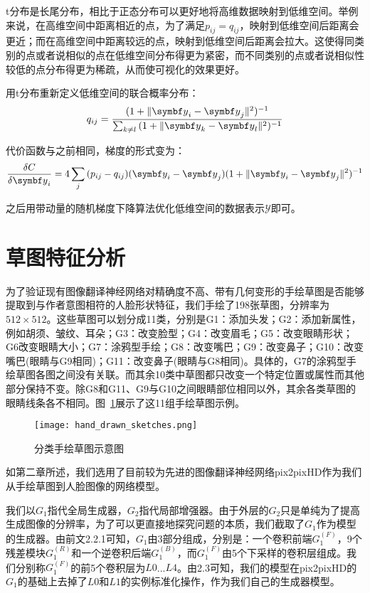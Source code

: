 t分布是长尾分布，相比于正态分布可以更好地将高维数据映射到低维空间。举例来说，在高维空间中距离相近的点，为了满足$p_{ij}=q_{ij}$，映射到低维空间后距离会更近；而在高维空间中距离较远的点，映射到低维空间后距离会拉大。这使得同类别的点或者说相似的点在低维空间分布得更为紧密，而不同类别的点或者说相似性较低的点分布得更为稀疏，从而使可视化的效果更好。

用t分布重新定义低维空间的联合概率分布：
\begin{equation}
	q_{ij} = \frac{(1+\lVert \vy_i-\vy_j\rVert^2)^{-1}}{\sum_{k\ne l}{(1+\lVert \vy_k-\vy_l \rVert^2)^{-1}}}
\end{equation}

代价函数与之前相同，梯度的形式变为：
\begin{equation}
	\frac{\delta C}{\delta \vy_i}=4\sum_{j}{(p_{ij}-q_{ij})(\vy_i-\vy_j)(1+\lVert \vy_i-\vy_j \rVert^2)^{-1}}
\end{equation}

之后用带动量的随机梯度下降算法优化低维空间的数据表示$\mathcal{Y}$即可。


\section{草图特征分析}

为了验证现有图像翻译神经网络对精确度不高、带有几何变形的手绘草图是否能够提取到与作者意图相符的人脸形状特征，我们手绘了198张草图，分辨率为$512\times512$。这些草图可以划分成11类，分别是G1：添加头发；G2：添加新属性，例如胡须、皱纹、耳朵；G3：改变脸型；G4：改变眉毛；G5：改变眼睛形状；G6改变眼睛大小；G7：涂鸦型手绘；G8：改变嘴巴；G9：改变鼻子；G10：改变嘴巴(眼睛与G9相同)；G11：改变鼻子(眼睛与G8相同)。具体的，G7的涂鸦型手绘草图各图之间没有关联。而其余10类中草图都只改变一个特定位置或属性而其他部分保持不变。除G8和G11、G9与G10之间眼睛部位相同以外，其余各类草图的眼睛线条各不相同。图~\ref{fig:hand_drawn_contours}展示了这11组手绘草图示例。
\begin{figure}[htb]
	\centering
	\texttt{[image: hand\_drawn\_sketches.png]}
	\caption{分类手绘草图示意图}
	\label{fig:hand_drawn_contours}
\end{figure}

如第二章所述，我们选用了目前较为先进的图像翻译神经网络pix2pixHD\cite{pix2pixhd}作为我们从手绘草图到人脸图像的网络模型。

我们以$G_1$指代全局生成器，$G_2$指代局部增强器。由于外层的$G_2$只是单纯为了提高生成图像的分辨率，为了可以更直接地探究问题的本质，我们截取了$G_1$作为模型的生成器。由前文2.2.1可知，$G_1$由3部分组成，分别是：一个卷积前端$G_1^{(F)}$，9个残差模块$G_1^{(R)}$和一个逆卷积后端$G_1^{(B)}$，而$G_1^{(F)}$由5个下采样的卷积层组成。我们分别称$G_1^{(F)}$的前5个卷积层为$L0$...$L4$。由2.3可知，我们的模型在pix2pixHD的$G_1$的基础上去掉了$L0$和$L1$的实例标准化操作，作为我们自己的生成器模型。

